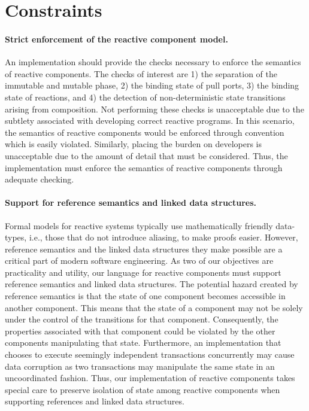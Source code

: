 \section{Constraints}

\paragraph{Strict enforcement of the reactive component model.}
An implementation should provide the checks necessary to enforce the semantics of reactive components.
The checks of interest are 1) the separation of the immutable and mutable phase, 2) the binding state of pull ports, 3) the binding state of reactions, and 4) the detection of non-deterministic state transitions arising from composition.
Not performing these checks is unacceptable due to the subtlety associated with developing correct reactive programs.
In this scenario, the semantics of reactive components would be enforced through convention which is easily violated.
Similarly, placing the burden on developers is unacceptable due to the amount of detail that must be considered.
Thus, the implementation must enforce the semantics of reactive components through adequate checking.

\paragraph{Support for reference semantics and linked data structures.}
Formal models for reactive systems typically use mathematically friendly data-types, i.e., those that do not introduce aliasing, to make proofs easier.
However, reference semantics and the linked data structures they make possible are a critical part of modern software engineering.
As two of our objectives are practicality and utility, our language for reactive components must support reference semantics and linked data structures.
The potential hazard created by reference semantics is that the state of one component becomes accessible in another component.
This means that the state of a component may not be solely under the control of the transitions for that component.
Consequently, the properties associated with that component could be violated by the other components manipulating that state.
Furthermore, an implementation that chooses to execute seemingly independent transactions concurrently may cause data corruption as two transactions may manipulate the same state in an uncoordinated fashion.
Thus, our implementation of reactive components takes special care to preserve isolation of state among reactive components when supporting references and linked data structures.

